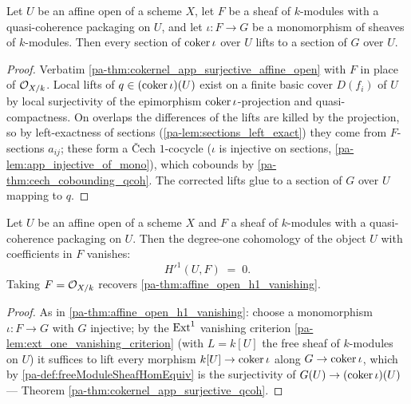 \begin{theorem}
  \label{pa-thm:cokernel_app_surjective_qcoh}
  \leanok

  Let \(U\) be an affine open of a scheme \(X\), let \(F\) be a sheaf of \(k\)-modules with a
  quasi-coherence packaging on \(U\), and let \(\iota : F \to G\) be a monomorphism of sheaves of
  \(k\)-modules. Then every section of \(\operatorname{coker} \iota\) over \(U\) lifts to a section of \(G\)
  over \(U\).
\end{theorem}
\begin{proof}
  \leanok
  Verbatim \ref{pa-thm:cokernel_app_surjective_affine_open} with \(F\) in place of \(\mathcal{O}_{X/k}\).
  Local lifts of \(q \in (\operatorname{coker} \iota)(U)\) exist on a finite basic cover \(D(f_i)\) of \(U\) by
  local surjectivity of the epimorphism \(\operatorname{coker}\iota\)-projection and quasi-compactness. On
  overlaps the differences of the lifts are killed by the projection, so by left-exactness of
  sections (\ref{pa-lem:sections_left_exact}) they come from \(F\)-sections \(a_{ij}\); these form a
  \v{C}ech \(1\)-cocycle (\(\iota\) is injective on sections, \ref{pa-lem:app_injective_of_mono}),
  which cobounds by \ref{pa-thm:cech_cobounding_qcoh}. The corrected lifts glue to a section of \(G\)
  over \(U\) mapping to \(q\).
\end{proof}

\begin{theorem}
  \label{pa-thm:hModule1_vanishing_qcoh}
  \leanok

  Let \(U\) be an affine open of a scheme \(X\) and \(F\) a sheaf of \(k\)-modules with a
  quasi-coherence packaging on \(U\). Then the degree-one cohomology of the object \(U\) with
  coefficients in \(F\) vanishes:
  \[
    H'^1(U, F) \;=\; 0 .
  \]
  Taking \(F = \mathcal{O}_{X/k}\) recovers \ref{pa-thm:affine_open_h1_vanishing}.
\end{theorem}
\begin{proof}
  \leanok
  As in \ref{pa-thm:affine_open_h1_vanishing}: choose a monomorphism \(\iota : F \to G\) with \(G\)
  injective; by the \(\operatorname{Ext}^1\) vanishing criterion \ref{pa-lem:ext_one_vanishing_criterion} (with
  \(L = k[U]\) the free sheaf of \(k\)-modules on \(U\)) it suffices to lift every morphism
  \(k[U] \to \operatorname{coker} \iota\) along \(G \to \operatorname{coker} \iota\), which by \ref{pa-def:freeModuleSheafHomEquiv}
  is the surjectivity of \(G(U) \to (\operatorname{coker} \iota)(U)\) — Theorem
  \ref{pa-thm:cokernel_app_surjective_qcoh}.
\end{proof}


